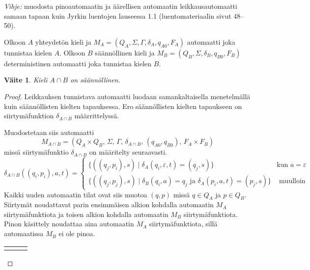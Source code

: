 \documentclass[a4paper,11pt, draft]{article}
\newtheorem*{claim}{Väite}
\newcommand{\ve}{\varepsilon}
\newenvironment{automata}[1][2.8]%
{\begin{tikzpicture}[->,>=stealth',shorten >=1pt,auto,node distance=#1cm,semithick]}%
{\end{tikzpicture}}
\begin{document}
\begin{enumerate}
\begin{enumerate}
      \emph{Vihje:} muodosta pinoautomaatin ja äärellisen automaatin
      leikkausautomaatti samaan tapaan kuin Jyrkin luentojen lauseessa 1.1
      (luentomateriaalin sivut 48--50).

      Olkoon $A$ yhteydetön kieli ja $M_A = (Q_A, \Sigma, \Gamma, \delta_A,
      q_{A0}, F_A)$ automaatti joka tunnistaa kielen $A$. Olkoon $B$
      säännöllinen kieli ja $M_B = (Q_B, \Sigma, \delta_B, q_{B0}, F_B)$
      deterministinen automaatti joka tunnistaa kielen $B$.
      \begin{claim}
         Kieli $A \cap B$ on säännöllinen.
      \end{claim}
      \begin{proof}
        Leikkauksen tunnistava automaatti luodaan samankaltaisella
        menetelmällä kuin säännöllisten kielten tapauksessa. Ero säännöllisten
        kielten tapaukseen on siirtymäfunktion $\delta_{A \cap B}$
        määrrittelyssä.

        Muodostetaan siis automaatti
        \begin{equation*}
          M_{A \cap B} = (Q_A \times Q_B \text{, } \Sigma \text{, } \Gamma
          \text{, } \delta_{A \cap B} \text{, } (q_{A0}, q_{B0}) \text{, } F_A
          \times F_B)
        \end{equation*}
        missä siirtymäfunktio $\delta_{A \cap B}$ on määritelty seuraavasti.
%
        \begin{equation*}
          \delta_{A \cap B}((q_i, p_i), a, t) = 
          \begin{cases}
            \{((q_j, p_i),s) \mid \delta_A(q_i, \ve, t) = (q_j, s)\} & \text{
              kun } a = \ve \\

            \{((q_j, p_j),s) \mid \delta_B(q_i, a) = q_j \text{ ja }
            \delta_A(p_i, a, t) = (p_j, s)\} & \text{ muulloin}
          \end{cases}
        \end{equation*}
%
        Kaikki uuden automaatin tilat ovat siis muotoa $(q, p)$ missä $q \in
        Q_A$ ja $p \in Q_B$. Siirtymät noudattavat parin ensimmäisen alkion
        kohdalla automaatin $M_A$ siirtymäfunktiota ja toisen alkion kohdalla
        automaatin $M_B$ siirtymäfunktiota. Pinon käsittely noudattaa aina
        automaatin $M_A$ siirtymäfunktiota, sillä automaatissa $M_B$ ei ole
        pinoa.
%
        \begin{center}
\end{center}
\end{proof}
\end{enumerate}
\end{enumerate}
\end{document}
